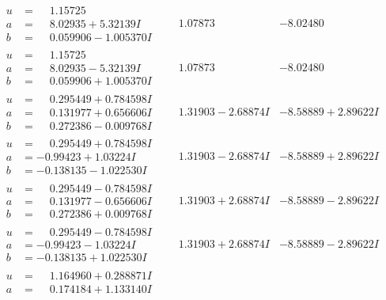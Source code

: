 \documentclass[1p]{elsarticle_modified}
\theoremstyle{definition}
\begin{document}
$$\begin{array}{c|c|c}
\begin{aligned}
u &= \phantom{-}1.15725\phantom{ +0.000000I} \\
a &= \phantom{-}8.02935 + 5.32139 I \\
b &= \phantom{-}0.059906 - 1.005370 I\end{aligned}
 & \phantom{-}1.07873\phantom{ +0.000000I} & -8.02480\phantom{ +0.000000I} \\ \hline\begin{aligned}
u &= \phantom{-}1.15725\phantom{ +0.000000I} \\
a &= \phantom{-}8.02935 - 5.32139 I \\
b &= \phantom{-}0.059906 + 1.005370 I\end{aligned}
 & \phantom{-}1.07873\phantom{ +0.000000I} & -8.02480\phantom{ +0.000000I} \\ \hline\begin{aligned}
u &= \phantom{-}0.295449 + 0.784598 I \\
a &= \phantom{-}0.131977 + 0.656606 I \\
b &= \phantom{-}0.272386 - 0.009768 I\end{aligned}
 & \phantom{-}1.31903 - 2.68874 I & -8.58889 + 2.89622 I \\ \hline\begin{aligned}
u &= \phantom{-}0.295449 + 0.784598 I \\
a &= -0.99423 + 1.03224 I \\
b &= -0.138135 - 1.022530 I\end{aligned}
 & \phantom{-}1.31903 - 2.68874 I & -8.58889 + 2.89622 I \\ \hline\begin{aligned}
u &= \phantom{-}0.295449 - 0.784598 I \\
a &= \phantom{-}0.131977 - 0.656606 I \\
b &= \phantom{-}0.272386 + 0.009768 I\end{aligned}
 & \phantom{-}1.31903 + 2.68874 I & -8.58889 - 2.89622 I \\ \hline\begin{aligned}
u &= \phantom{-}0.295449 - 0.784598 I \\
a &= -0.99423 - 1.03224 I \\
b &= -0.138135 + 1.022530 I\end{aligned}
 & \phantom{-}1.31903 + 2.68874 I & -8.58889 - 2.89622 I \\ \hline\begin{aligned}
u &= \phantom{-}1.164960 + 0.288871 I \\
a &= \phantom{-}0.174184 + 1.133140 I \\

\end{aligned}
\end{array}$$
\end{document}
